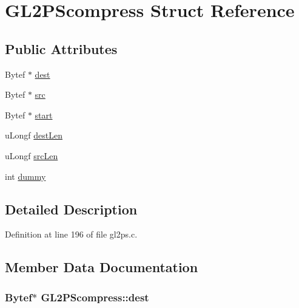 \hypertarget{struct_g_l2_p_scompress}{}\section{G\+L2\+P\+Scompress Struct Reference}
\label{struct_g_l2_p_scompress}
\subsection*{Public Attributes}
\begin{DoxyCompactItemize}
\item 
Bytef $\ast$ \hyperlink{struct_g_l2_p_scompress_a19f042f1e76eb66de476f2489c4a9dd1}{dest}
\item 
Bytef $\ast$ \hyperlink{struct_g_l2_p_scompress_a82320ed62be91ea1f1a8b92711912f0e}{src}
\item 
Bytef $\ast$ \hyperlink{struct_g_l2_p_scompress_a011ba6d566d5a2b147fe3f43f0ed6f35}{start}
\item 
u\+Longf \hyperlink{struct_g_l2_p_scompress_abe61bed6b88386094c626710bfa6e42d}{dest\+Len}
\item 
u\+Longf \hyperlink{struct_g_l2_p_scompress_a04d79912255b3de2b651400d461c946b}{src\+Len}
\item 
int \hyperlink{struct_g_l2_p_scompress_ac05cb9cfb6af433cd4f7bd9005345df3}{dummy}
\end{DoxyCompactItemize}


\subsection{Detailed Description}


Definition at line 196 of file gl2ps.\+c.



\subsection{Member Data Documentation}
\hypertarget{struct_g_l2_p_scompress_a19f042f1e76eb66de476f2489c4a9dd1}{}
\subsubsection[{dest}]{\setlength{\rightskip}{0pt plus 5cm}Bytef$\ast$ G\+L2\+P\+Scompress\+::dest}\label{struct_g_l2_p_scompress_a19f042f1e76eb66de476f2489c4a9dd1}


